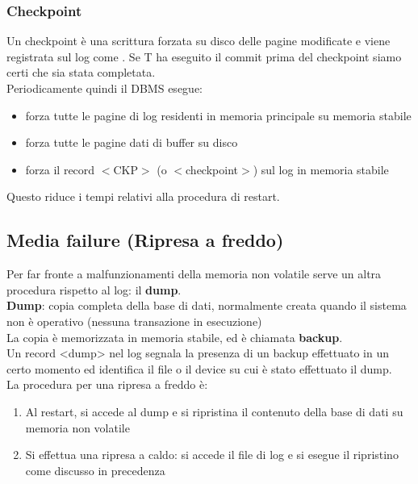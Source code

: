 \subsubsection{Checkpoint}
Un checkpoint \`e una scrittura forzata su disco delle pagine modificate e viene registrata sul log come . Se T ha eseguito il commit prima del checkpoint siamo certi che sia stata completata.\\
Periodicamente quindi il DBMS esegue:
\begin{itemize}
    \item forza tutte le pagine di log residenti in memoria principale su memoria stabile
    \item forza tutte le pagine dati di buffer su disco
    \item forza il record $<$CKP$>$ (o $<$checkpoint$>$) sul log in memoria stabile
\end{itemize}
Questo riduce i tempi relativi alla procedura di restart.

\subsection{Media failure (Ripresa a freddo)}
Per far fronte a malfunzionamenti della memoria non volatile serve un altra procedura rispetto al log: il \textbf{dump}.\\
\textbf{Dump}: copia completa della base di dati, normalmente creata quando il sistema non è operativo (nessuna transazione in esecuzione)\\
La copia è memorizzata in memoria stabile, ed è chiamata \textbf{backup}.\\
Un record <dump> nel log segnala la presenza di un backup effettuato in un certo momento ed identifica il file o il device su cui è stato effettuato il dump.\vspace{2mm}\\
La procedura per una ripresa a freddo \`e:
\begin{enumerate}
    \item Al restart, si accede al dump e si ripristina il contenuto della base di dati su memoria non volatile
    \item Si effettua una ripresa a caldo: si accede il file di log e si esegue il ripristino come discusso in precedenza
\end{enumerate}